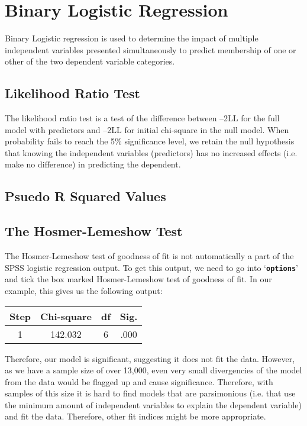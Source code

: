 \documentclass[a4paper,12pt]{article}
\begin{document}
\section{Binary Logistic Regression}
Binary Logistic regression is used to determine the impact of multiple independent variables
presented simultaneously to predict membership of one or other of the two
dependent variable categories.

\subsection{Likelihood Ratio Test}
The likelihood ratio test is a test of the difference between –2LL for the full
model with predictors and –2LL for initial chi-square in the null model.
When probability fails to reach the 5\% significance level, we retain the null hypothesis
that knowing the independent variables (predictors) has no increased effects (i.e. make no
difference) in predicting the dependent.

\subsection{Psuedo R Squared Values}


\subsection{The Hosmer-Lemeshow Test}

The Hosmer-Lemeshow test of goodness of fit is not automatically a part of the SPSS logistic regression output. To get this output, we need to go into `\textbf{\texttt{options}}’ and tick the box marked Hosmer-Lemeshow test of goodness of fit. In our example, this gives us the following output:

\begin{tabular}{|c|c|c|c|}
\hline  Step	& Chi-square&	df 	 & Sig. \\ \hline
 1	 & 142.032	& 6	 &.000 \\ 
\hline 
\end{tabular} 

Therefore, our model is significant, suggesting it does not fit the data. However, as we have a sample size of over 13,000, even very small divergencies of the model from the data would be flagged up and cause significance. Therefore, with samples of this size it is hard to find models that are parsimonious (i.e. that use the minimum amount of independent variables to explain the dependent variable) and fit the data. Therefore, other fit indices might be more appropriate.
\end{document}

